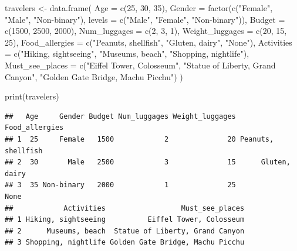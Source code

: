 \documentclass[
]{book}
\newenvironment{Shaded}{\begin{snugshade}}{\end{snugshade}}
\newcommand{\AttributeTok}[1]{\textcolor[rgb]{0.77,0.63,0.00}{#1}}
\newcommand{\DecValTok}[1]{\textcolor[rgb]{0.00,0.00,0.81}{#1}}
\newcommand{\FunctionTok}[1]{\textcolor[rgb]{0.00,0.00,0.00}{#1}}
\newcommand{\NormalTok}[1]{#1}
\newcommand{\OtherTok}[1]{\textcolor[rgb]{0.56,0.35,0.01}{#1}}
\newcommand{\StringTok}[1]{\textcolor[rgb]{0.31,0.60,0.02}{#1}}
\begin{document}
\begin{Shaded}
\begin{Highlighting}[]
\NormalTok{travelers }\OtherTok{\textless{}{-}} \FunctionTok{data.frame}\NormalTok{(}
  \AttributeTok{Age =} \FunctionTok{c}\NormalTok{(}\DecValTok{25}\NormalTok{, }\DecValTok{30}\NormalTok{, }\DecValTok{35}\NormalTok{),}
  \AttributeTok{Gender =} \FunctionTok{factor}\NormalTok{(}\FunctionTok{c}\NormalTok{(}\StringTok{"Female"}\NormalTok{, }\StringTok{"Male"}\NormalTok{, }\StringTok{"Non{-}binary"}\NormalTok{), }\AttributeTok{levels =} \FunctionTok{c}\NormalTok{(}\StringTok{"Male"}\NormalTok{, }\StringTok{"Female"}\NormalTok{, }\StringTok{"Non{-}binary"}\NormalTok{)),}
  \AttributeTok{Budget =} \FunctionTok{c}\NormalTok{(}\DecValTok{1500}\NormalTok{, }\DecValTok{2500}\NormalTok{, }\DecValTok{2000}\NormalTok{),}
  \AttributeTok{Num\_luggages =} \FunctionTok{c}\NormalTok{(}\DecValTok{2}\NormalTok{, }\DecValTok{3}\NormalTok{, }\DecValTok{1}\NormalTok{),}
  \AttributeTok{Weight\_luggages =} \FunctionTok{c}\NormalTok{(}\DecValTok{20}\NormalTok{, }\DecValTok{15}\NormalTok{, }\DecValTok{25}\NormalTok{),}
  \AttributeTok{Food\_allergies =} \FunctionTok{c}\NormalTok{(}\StringTok{"Peanuts, shellfish"}\NormalTok{, }\StringTok{"Gluten, dairy"}\NormalTok{, }\StringTok{"None"}\NormalTok{),}
  \AttributeTok{Activities =} \FunctionTok{c}\NormalTok{(}\StringTok{"Hiking, sightseeing"}\NormalTok{, }\StringTok{"Museums, beach"}\NormalTok{, }\StringTok{"Shopping, nightlife"}\NormalTok{),}
  \AttributeTok{Must\_see\_places =} \FunctionTok{c}\NormalTok{(}\StringTok{"Eiffel Tower, Colosseum"}\NormalTok{, }\StringTok{"Statue of Liberty, Grand Canyon"}\NormalTok{, }\StringTok{"Golden Gate Bridge, Machu Picchu"}\NormalTok{)}
\NormalTok{)}

\FunctionTok{print}\NormalTok{(travelers)}
\end{Highlighting}
\end{Shaded}

\begin{verbatim}
##   Age     Gender Budget Num_luggages Weight_luggages     Food_allergies
## 1  25     Female   1500            2              20 Peanuts, shellfish
## 2  30       Male   2500            3              15      Gluten, dairy
## 3  35 Non-binary   2000            1              25               None
##            Activities                  Must_see_places
## 1 Hiking, sightseeing          Eiffel Tower, Colosseum
## 2      Museums, beach  Statue of Liberty, Grand Canyon
## 3 Shopping, nightlife Golden Gate Bridge, Machu Picchu
\end{verbatim}
\end{document}
